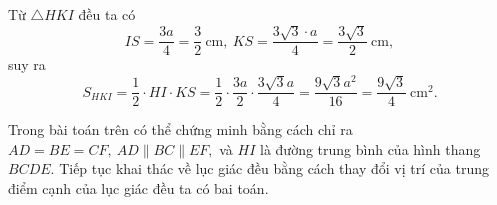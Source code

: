 \begin{bt}
{\begin{enumerate}
{\begin{tikzpicture}
\end{tikzpicture}}
Từ $\triangle HKI$ đều ta có
$$IS=\dfrac{3a}{4}=\dfrac{3}{2}\ \text{cm},\ KS=\dfrac{3\sqrt{3}\cdot a}{4}=\dfrac{3\sqrt{3}}{2}\ \text{cm},$$
suy ra $$S_{HKI}=\dfrac{1}{2}\cdot HI \cdot KS=\dfrac{1}{2}\cdot \dfrac{3a}{2}\cdot \dfrac{3\sqrt{3}a}{4}=\dfrac{9\sqrt{3}a^2}{16}=\dfrac{9\sqrt{3}}{4}\ \text{cm}^2.$$
\end{enumerate}
\begin{nx}
Trong bài toán trên có thể chứng minh bằng cách chỉ ra $AD=BE=CF,\ AD\parallel BC \parallel EF,$ và $HI$ là đường trung bình của hình thang $BCDE$. Tiếp tục khai thác về lục giác đều bằng cách thay đổi vị trí của trung điểm cạnh của lục giác đều ta có bai toán.
\end{nx}
}
\end{bt}

